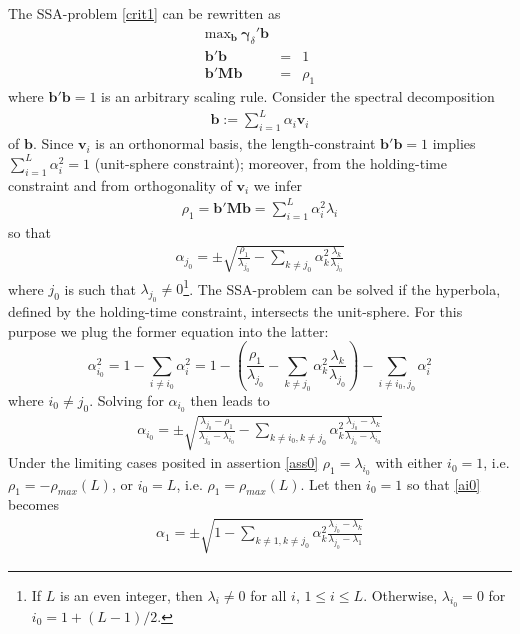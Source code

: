 \documentclass[a4paper]{article}
\begin{document}
The SSA-problem  \ref{crit1} can be rewritten as
\begin{eqnarray}
\textrm{max}_{\mathbf{b}}~\boldsymbol{\gamma}_{\delta}'\mathbf{b}&&\nonumber\\
\mathbf{b}'\mathbf{b}&=&1\nonumber\\
\mathbf{b}'\mathbf{M}\mathbf{b}&=&\rho_1\label{nonconvex}
\end{eqnarray}
where $\mathbf{b}'\mathbf{b}=1$ is an arbitrary scaling rule. 
Consider the spectral decomposition  
\begin{eqnarray}\label{specdecdecb}
\mathbf{b}:=\sum_{i=1}^L\alpha_i\mathbf{v}_i
\end{eqnarray}
of $\mathbf{b}$. Since $\mathbf{v}_i$ is an orthonormal basis, the length-constraint $\mathbf{b}'\mathbf{b}=1$ implies $\sum_{i=1}^L\alpha_i^2=1$ (unit-sphere constraint); moreover, from the holding-time constraint and from  orthogonality of $\mathbf{v}_i$  we infer
\begin{eqnarray*}
\rho_1=\mathbf{b}'\mathbf{Mb}=\sum_{i=1}^L \alpha_i^2\lambda_i
\end{eqnarray*}
so that 
\begin{eqnarray*}
\alpha_{j_0}=\pm \sqrt{\frac{\rho_1}{\lambda_{j_0}}-\sum_{k\neq j_0}\alpha_k^2\frac{\lambda_k}{\lambda_{j_0}}}
\end{eqnarray*}
where $j_0$ is such that $\lambda_{j_0}\neq 0$\footnote{If $L$ is an even integer, then $\lambda_i\neq 0$ for all $i$, $1\leq i\leq L$. Otherwise, $\lambda_{i_0}=0$ for $i_0=1+(L-1)/2$.}. The SSA-problem can be solved if the hyperbola, defined by the holding-time constraint, intersects the unit-sphere. For this purpose we  plug the former equation into the latter:
\[
\alpha_{i_0}^2=1-\sum_{i\neq i_0}\alpha_i^2=1-\left(\frac{\rho_1}{\lambda_{j_0}}-\sum_{k\neq j_0}\alpha_k^2\frac{\lambda_k}{\lambda_{j_0}}\right)-\sum_{i\neq i_0,j_0}\alpha_i^2
\]
where $i_0\neq j_0$. 
Solving for $\alpha_{i_0}$ then leads to
\begin{eqnarray}\label{ai0}
\alpha_{i_0}=\pm\sqrt{\frac{\lambda_{j_0}-\rho_1}{\lambda_{j_0}-\lambda_{i_0}}-\sum_{k\neq i_0,k\neq j_0}\alpha_k^2\frac{\lambda_{j_0}-\lambda_k}{\lambda_{j_0}-\lambda_{i_0}}}
\end{eqnarray}
Under the limiting cases posited in assertion \ref{ass0} $\rho_1=\lambda_{i_0}$ with either $i_0=1$, i.e. $\rho_1=-\rho_{max}(L)$, or $i_0=L$, i.e. $\rho_1=\rho_{max}(L)$. Let then $i_0=1$ so that \ref{ai0} becomes
\begin{eqnarray}\label{ai0n}
\alpha_{1}=\pm\sqrt{1-\sum_{k\neq 1,k\neq j_0}\alpha_k^2\frac{\lambda_{j_0}-\lambda_k}{\lambda_{j_0}-\lambda_{1}}}
\end{eqnarray}
\end{document}
